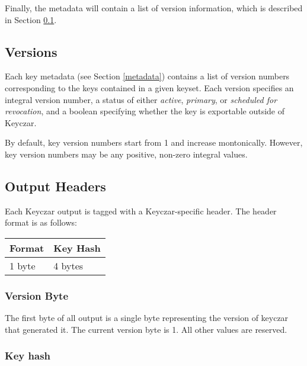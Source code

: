 \documentclass{llncs}
\begin{document}
Finally, the metadata will contain a list of version information, which is
described in Section \ref{versions}.

\subsection{Versions}\label{versions}

Each key metadata (see Section \ref{metadata}) contains a list of version
numbers corresponding to the keys contained in a given keyset. Each version
specifies an integral version number, a status of either {\it active}, {\it
primary}, or {\it scheduled for revocation}, and a boolean specifying whether
the key is exportable outside of Keyczar.

By default, key version numbers start from 1 and increase montonically.
However, key version numbers may be any positive, non-zero integral values.

\subsection{Output Headers} \label{header}

Each Keyczar output is tagged with a Keyczar-specific header. The header format
is as follows:

\begin{tabular}{| l | l |}
\hline
Format & Key Hash \\ \hline
1 byte & 4 bytes \\ \hline
\end{tabular}

\subsubsection{Version Byte}

The first byte of all output is a single byte representing the version of
keyczar that generated it. The current version byte is 1. All other values are
reserved.

\subsubsection{Key hash}\label{keyhash}
\end{document}
